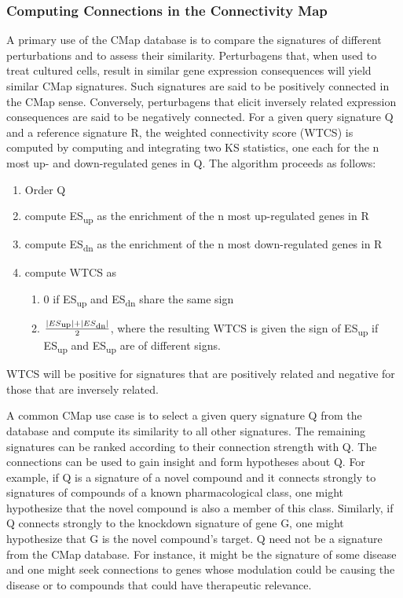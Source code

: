 \documentclass[12pt]{article}
\begin{document}
\subsubsection{Computing Connections in the Connectivity Map}

A primary use of the CMap database is to compare the signatures of different perturbations and to assess their similarity. Perturbagens that, when used to treat cultured cells, result in similar gene expression consequences will yield similar CMap signatures. Such signatures are said to be positively connected in the CMap sense. Conversely, perturbagens that elicit inversely related expression consequences are said to be negatively connected. For a given query signature Q and a reference signature R, the weighted connectivity score (WTCS) is computed by computing and integrating two KS statistics, one each for the n most up- and down-regulated genes in Q. The algorithm proceeds as follows:
\begin{enumerate}
\item Order Q
\item compute ES\textsubscript{up} as the enrichment of the n most up-regulated genes in R
\item compute ES\textsubscript{dn} as the enrichment of the n most down-regulated genes in R
\item compute WTCS as 
\begin{enumerate}
	\item 0 if ES\textsubscript{up} and ES\textsubscript{dn} share the same sign
	\item $ \frac{|ES\textsubscript{up}| + |ES\textsubscript{dn}|}{2} $, where the resulting WTCS is given the sign of ES\textsubscript{up} if ES\textsubscript{up} and ES\textsubscript{up} are of different signs.
\end{enumerate}
\end{enumerate}

WTCS will be positive for signatures that are positively related and negative for those that are inversely related.

A common CMap use case is to select a given query signature Q from the database and compute its similarity to all other signatures. The remaining signatures can be ranked according to their connection strength with Q. The connections can be used to gain insight and form hypotheses about Q. For example, if Q is a signature of a novel compound and it connects strongly to signatures of compounds of a known pharmacological class, one might hypothesize that the novel compound is also a member of this class. Similarly, if Q connects strongly to the knockdown signature of gene G, one might hypothesize that G is the novel compound's target. Q need not be a signature from the CMap database. For instance, it might be the signature of some disease and one might seek connections to genes whose modulation could be causing the disease or to compounds that could have therapeutic relevance. 
\end{document}
